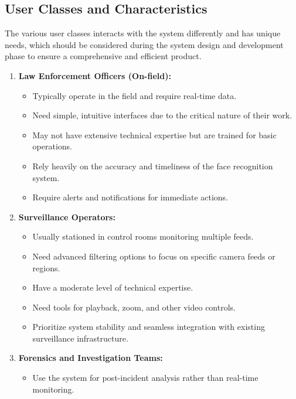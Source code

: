     \subsection{User Classes and Characteristics}
        The various user classes interacts with the system differently and has unique needs, which should be considered during the system design and development phase to ensure a comprehensive and efficient product. 
        \begin{enumerate}
            \item \textbf{Law Enforcement Officers (On-field):}
                \begin{itemize}
                    \item Typically operate in the field and require real-time data.
                    \item Need simple, intuitive interfaces due to the critical nature of their work.
                    \item May not have extensive technical expertise but are trained for basic operations.
                    \item Rely heavily on the accuracy and timeliness of the face recognition system.
                    \item Require alerts and notifications for immediate actions.     
                \end{itemize}
            \item \textbf{Surveillance Operators:}
                \begin{itemize}
                    \item Usually stationed in control rooms monitoring multiple feeds.
                    \item Need advanced filtering options to focus on specific camera feeds or regions.
                    \item Have a moderate level of technical expertise.
                    \item Need tools for playback, zoom, and other video controls.
                    \item Prioritize system stability and seamless integration with existing surveillance infrastructure.    
                \end{itemize}
            \item \textbf{Forensics and Investigation Teams:}
                \begin{itemize}
                    \item Use the system for post-incident analysis rather than real-time monitoring.

\end{itemize}
\end{enumerate}
